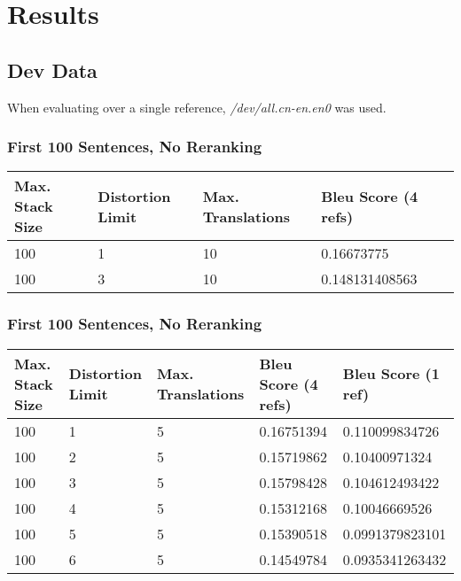 \documentclass[letterpaper]{article}
\begin{document}
\section{Results}

\subsection{Dev Data}

When evaluating over a single reference, \textit{/dev/all.cn-en.en0} was used.

\subsubsection{First 100 Sentences, No Reranking}
\begin{center}
  \begin{tabularx}{0.95\textwidth}{| X | X | X | X | X |}
  \hline
  Max. Stack Size & Distortion Limit & Max. Translations & Bleu Score (4 refs) \\
  \hline
  100 & 1 & 10 & 0.16673775\\
  \hline
  100 & 3 & 10 & 0.148131408563\\
  \hline
  \end{tabularx}
\end{center}

\subsubsection{First 100 Sentences, No Reranking}
\begin{center}
  \begin{tabularx}{0.95\textwidth}{| X | X | X | X | X |}
  \hline
  Max. Stack Size & Distortion Limit & Max. Translations & Bleu Score (4 refs) & Bleu Score (1 ref) \\
  \hline
  100 & 1 & 5 & 0.16751394 & 0.110099834726\\
  \hline
  100 & 2 & 5 & 0.15719862 & 0.10400971324\\
  \hline
  100 & 3 & 5 & 0.15798428 & 0.104612493422\\
  \hline
  100 & 4 & 5 & 0.15312168 & 0.10046669526\\
  \hline
  100 & 5 & 5 & 0.15390518 & 0.0991379823101\\
  \hline
  100 & 6 & 5 & 0.14549784 & 0.0935341263432\\
  \hline
  \end{tabularx}
\end{center}
\end{document}
